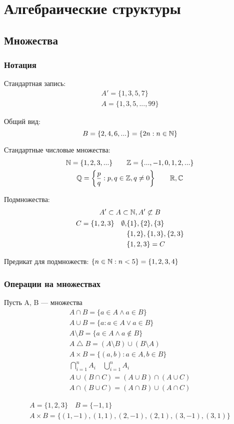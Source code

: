 \documentclass[main]{subfiles}
\begin{document}
\part{Алгебраические структуры}
\chapter{Множества}
\section{Нотация}
Стандартная запись:
\begin{gather*}
    A' = \{1,3,5,7\}\\
    A=\{1,3,5, ..., 99\}
\end{gather*}

Общий вид:
\[B = \{2,4,6,...\} = \{2n: n\in \mathbb{N}\}\]

Стандартные числовые множества:
\begin{gather*}
    \mathbb{N} =\{1,2,3,...\} \qquad \mathbb{Z} =\{...,-1,0,1,2,...\}\\
    \mathbb{Q} = \left\{ \frac{p}{q}: p,q \in \mathbb{Z}, q \neq 0 \right\} \qquad \mathbb{R}, \mathbb{C}
\end{gather*}

Подмножества:
\begin{gather*}
    A' \subset A \subset \mathbb{N}, A' \not\subset B\\
    \begin{aligned}
        C & = \{1,2,3\} & \emptyset, & \{1\},  \{2\}, \{3\}     \\
          &             &            & \{1,2\},\{1,3\}, \{2,3\} \\
          &             &            & \{1,2,3\} = C
    \end{aligned}
\end{gather*}

Предикат для подмножеств: $\{n \in \mathbb{N} : n < 5\} = \{1,2,3,4\}$

\section{Операции на множествах}
Пусть A, B --- множества
\begin{gather*}
    A \cap B = \{a \in A \land  a \in B\}\\
    A \cup B = \{a: a \in A \lor a \in B\}\\
    A \setminus B = \{a\in A \land a\not\in B\}\\
    A \bigtriangleup B = (A \setminus B) \cup (B \setminus A)\\
    A \times B = \{(a,b):a\in A, b \in B\}\\
    \bigcap_{i=1}^n A_i \quad \bigcup_{i=1}^n A_i\\
    A \cup (B \cap C) = (A \cup B) \cap (A \cup C)\\
    A \cap (B \cup C) = (A \cap B) \cup (A \cap C)
\end{gather*}
\begin{example}
    \begin{gather*}
        A = \{1,2,3\} \quad B = \{-1, 1\} \\
        A \times B = \{ (1,-1), (1,1), (2, -1), (2,1), (3, -1), (3,1)\}
    \end{gather*}
\end{example}
\end{document}
